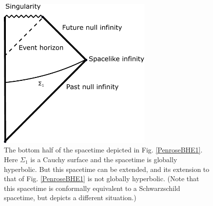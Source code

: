 \documentclass[authoryear,12pt,3p]{jowarticle}
\begin{document}
\begin{figure}[h]    \centering
   \includegraphics[width=3in]{BHE_Bottom_Half.pdf}
   \caption{\label{BottomHalf} The bottom half of the spacetime depicted in Fig. \ref{PenroseBHE1}. Here $\Sigma_1$ is a Cauchy surface and the spacetime is globally hyperbolic.  But this spacetime can be extended, and its extension to that of Fig. \ref{PenroseBHE1} is not globally hyperbolic.  (Note that this spacetime is conformally equivalent to a Schwarzschild spacetime, but depicts a different situation.)}
\end{figure}
\end{document}
